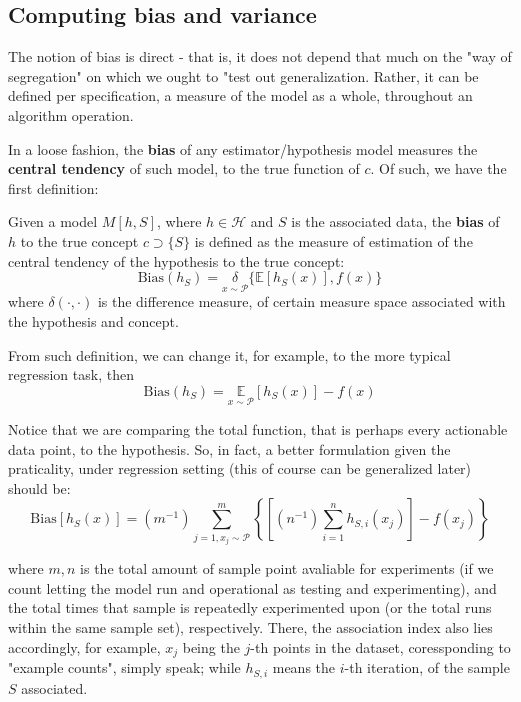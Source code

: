 \subsection{Computing bias and variance}

The notion of bias is direct - that is, it does not depend that much on the "way of segregation" on which we ought to "test out generalization. Rather, it can be defined per specification, a measure of the model as a whole, throughout an algorithm operation. 

In a loose fashion, the \textbf{bias} of any estimator/hypothesis model measures the \textbf{central tendency} of such model, to the true function of $c$. Of such, we have the first definition: 

\begin{definition}[Bias, I]
  Given a model $M[h,S]$, where $h\in\mathcal{H}$ and $S$ is the associated data, the \textbf{bias} of $h$ to the true concept $c\supset \{S\}$ is defined as the measure of estimation of the central tendency of the hypothesis to the true concept: 
  \begin{equation}
    \mathrm{Bias}(h_S) = \underset{x\sim \mathcal{P}}{\delta}\{ \mathbb{E}[h_S (x)] ,f(x)  \}
  \end{equation} 
  where $\delta(\cdot, \cdot)$ is the difference measure, of certain measure space associated with the hypothesis and concept.  
\end{definition}

From such definition, we can change it, for example, to the more typical regression task, then
\begin{equation}
  \mathrm{Bias}(h_S) = \underset{x\sim \mathcal{P}}{\mathbb{E}}[h_S (x)] - f(x)
\end{equation}

Notice that we are comparing the total function, that is perhaps every actionable data point, to the hypothesis. So, in fact, a better formulation given the praticality, under regression setting (this of course can be generalized later) should be: 
\begin{equation}
  \mathrm{Bias}[h_S(x)] = (m^{-1})\sum_{j =1, x_j \sim \mathcal{P}}^{m} \left\{ \left[(n^{-1}) \sum_{i=1}^{n} h_{S, i}(x_{j})\right] - f(x_{j})\right\}
\end{equation}

where $m, n$ is the total amount of sample point avaliable for experiments (if we count letting the model run and operational as testing and experimenting), and the total times that sample is repeatedly experimented upon (or the total runs within the same sample set), respectively. There, the association index also lies accordingly, for example, $x_j$ being the $j$-th points in the dataset, coressponding to "example counts", simply speak; while $h_{S,i}$ means the $i$-th iteration, of the sample $S$ associated. 


